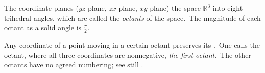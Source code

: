 \documentclass[12pt]{article}
\theoremstyle{definition}
\begin{document}
The coordinate planes ($yz$-plane, $zx$-plane, $xy$-plane)  the space $\mathbb{R}^3$ into eight trihedral angles, which are called the \emph{octants} of the space.\, The magnitude of each octant as a solid angle is $\frac{\pi}{2}$.\, 

Any coordinate of a point moving in a certain octant preserves its .\, One calls the octant, where all three coordinates are nonnegative, \emph{the first octant}.\, The other octants have no agreed numbering; see still .
\end{document}
